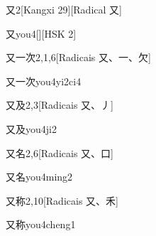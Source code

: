\begin{entry}{又}{2}[Kangxi 29][Radical ⼜]
  \begin{phonetics}{又}{you4}[][HSK 2]
  \end{phonetics}
\end{entry}

\begin{entry}{又一次}{2,1,6}[Radicais ⼜、⼀、⽋]
  \begin{phonetics}{又一次}{you4yi2ci4}
  \end{phonetics}
\end{entry}

\begin{entry}{又及}{2,3}[Radicais ⼜、⼃]
  \begin{phonetics}{又及}{you4ji2}
  \end{phonetics}
\end{entry}

\begin{entry}{又名}{2,6}[Radicais ⼜、⼝]
  \begin{phonetics}{又名}{you4ming2}
  \end{phonetics}
\end{entry}

\begin{entry}{又称}{2,10}[Radicais ⼜、⽲]
  \begin{phonetics}{又称}{you4cheng1}
  \end{phonetics}
\end{entry}


